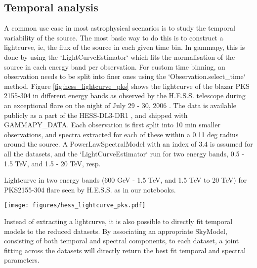 \subsection{Temporal analysis}
\label{ssec:temporal-analysis}

A common use case in most astrophysical scenarios is to study the temporal variability of the source. The most basic way to do this is to construct a lightcurve, ie, the flux of the source in each given time bin. In gammapy, this is done by using the `LightCurveEstimator` which fits the normalisation of the source in each energy band per observation. For custom time binning, an observation needs to be split into finer ones using the `Observation.select_time` method. Figure \ref{fig:hess_lightcurve_pks} shows the lightcurve of the blazar PKS 2155-304 in different energy bands as observed by the H.E.S.S. telescope during an exceptional flare on the night of July 29 - 30, 2006 \cite{2009A&A...502..749A}. The data is available publicly as a part of the HESS-DL3-DR1 \cite{HESS-DL3-DR1}, and shipped with GAMMAPY_DATA. Each observation is first split into 10 min smaller observations, and spectra extracted for each of these within a 0.11 deg radius around the source. A PowerLawSpectralModel with an index of 3.4 is assumed for all the datasets, and the `LightCurveEstimator` run for two energy bands, 0.5 - 1.5 TeV, and 1.5 - 20 TeV, resp.


Lightcurve in two energy bands (600 GeV - 1.5 TeV, and 1.5 TeV to 20 TeV) for
PKS2155-304 flare seen by H.E.S.S. as in our notebooks. 

\begin{figure*}[t]
	\centering
	\texttt{[image: figures/hess\_lightcurve\_pks.pdf]}
	\caption{10 min binned lightcurve for PKS~2155-304 in two energy bands, (500 GeV - 1.5 TeV, and 1.5 TeV to 20 TeV) as observed by the H.E.S.S. telescopes in 2006.}
	\label{fig:hess_lightcurve_pks} 
\end{figure*}

Instead of extracting a lightcurve, it is also possible to directly fit temporal models to the reduced datasets. By associating an appropriate SkyModel, consisting of both temporal and spectral components, to each dataset, a joint fitting across the datasets will directly return the best fit temporal and spectral parameters. 